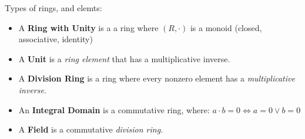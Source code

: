 \documentclass{article}
\begin{document}
{\noindent}Types of rings, and elemts:
\begin{itemize}
  \item
    A {\bf Ring with Unity} is a a ring where $(R, \cdot)$ is a
    monoid (closed, associative, identity)
  \item
    A {\bf Unit} is a \emph{ring element} that has a multiplicative
    inverse.
  \item
    A {\bf Division Ring} is a ring where every nonzero element has a
    \emph{multiplicative inverse}.
  \item
    An {\bf Integral Domain} is a commutative ring, where:
    $a \cdot b = 0 \iff a=0 \lor b=0$
  \item
    A {\bf Field} is a commutative \emph{division ring}.
\end{itemize}
\end{document}
